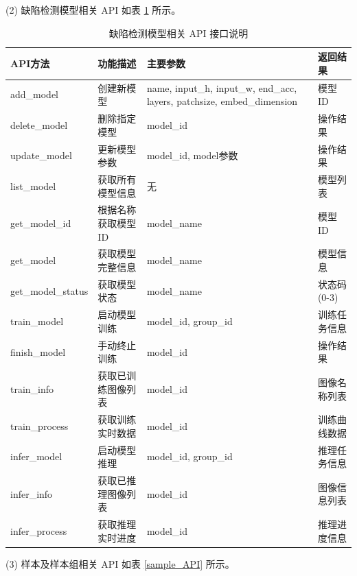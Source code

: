 \documentclass[
  ]{njuthesis}
\begin{document}
(2) 缺陷检测模型相关 API 如表 \ref{model_API} 所示。

\begin{table}[H]
    \centering
    \caption{缺陷检测模型相关 API 接口说明}
    \label{model_API}
    \renewcommand\arraystretch{0.5}
    \begin{tabular}{p{2.5cm}p{3.5cm}p{4cm}p{2.5cm}}
    \toprule[1.5pt]
    API方法 & 功能描述 & 主要参数 & 返回结果 \\
    \midrule[1pt]
    add\_model & 创建新模型 & name, input\_h, input\_w, end\_acc, layers, patchsize, embed\_dimension & 模型ID \\
    \midrule[0.5pt]
    delete\_model & 删除指定模型 & model\_id & 操作结果 \\
    \midrule[0.5pt]
    update\_model & 更新模型参数 & model\_id, model参数 & 操作结果 \\
    \midrule[0.5pt]
    list\_model & 获取所有模型信息 & 无 & 模型列表 \\
    \midrule[0.5pt]
    get\_model\_id & 根据名称获取模型ID & model\_name & 模型ID \\
    \midrule[0.5pt]
    get\_model & 获取模型完整信息 & model\_name & 模型信息 \\
    \midrule[0.5pt]
    get\_model\_status & 获取模型状态 & model\_name & 状态码(0-3) \\
    \midrule[0.5pt]
    train\_model & 启动模型训练 & model\_id, group\_id & 训练任务信息 \\
    \midrule[0.5pt]
    finish\_model & 手动终止训练 & model\_id & 操作结果 \\
    \midrule[0.5pt]
    train\_info & 获取已训练图像列表 & model\_id & 图像名称列表 \\
    \midrule[0.5pt]
    train\_process & 获取训练实时数据 & model\_id & 训练曲线数据 \\
    \midrule[0.5pt]
    infer\_model & 启动模型推理 & model\_id, group\_id & 推理任务信息 \\
    \midrule[0.5pt]
    infer\_info & 获取已推理图像列表 & model\_id & 图像信息列表 \\
    \midrule[0.5pt]
    infer\_process & 获取推理实时进度 & model\_id & 推理进度信息 \\
    \bottomrule[1.5pt]
    \end{tabular}
\end{table}

(3) 样本及样本组相关 API 如表 \ref{sample_API} 所示。
\end{document}
